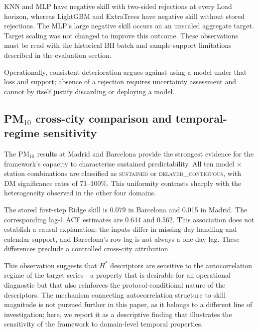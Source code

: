 \documentclass[pdflatex,sn-mathphys]{sn-jnl}
\begin{document}
KNN and MLP have negative skill with two-sided rejections at every Load
horizon, whereas LightGBM and ExtraTrees have negative skill without stored
rejections. The MLP's large negative skill occurs on an unscaled aggregate
target. Target scaling was not changed to improve this outcome. These
observations must be read with the historical BH batch and sample-support
limitations described in the evaluation section.

Operationally, consistent deterioration argues against using a model under
that loss and support; absence of a rejection requires uncertainty assessment
and cannot by itself justify discarding or deploying a model.

\subsection{PM$_{10}$ cross-city comparison and temporal-regime sensitivity}\label{sec:pm10-discuss}

The PM$_{10}$ results at Madrid and Barcelona provide the strongest evidence for the framework's capacity to characterise sustained predictability. All ten model $\times$ station combinations are classified as \textsc{sustained} or \textsc{delayed\_contiguous}, with DM significance rates of 71--100\%. This uniformity contrasts sharply with the heterogeneity observed in the other four domains.

The stored first-step Ridge skill is 0.079 in Barcelona and 0.015 in Madrid.
The corresponding lag-1 ACF estimates are 0.644 and 0.562. This association
does not establish a causal explanation: the inputs differ in missing-day
handling and calendar support, and Barcelona's row lag is not always a
one-day lag. These differences preclude a controlled cross-city attribution.

This observation suggests that $H^*$ descriptors are sensitive to the autocorrelation regime of the target series—a property that is desirable for an operational diagnostic but that also reinforces the protocol-conditional nature of the descriptors. The mechanism connecting autocorrelation structure to skill magnitude is not pursued further in this paper, as it belongs to a different line of investigation; here, we report it as a descriptive finding that illustrates the sensitivity of the framework to domain-level temporal properties.

\end{document}
